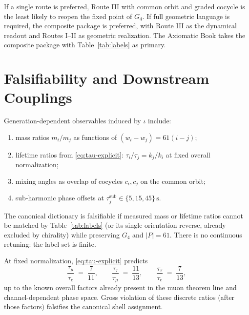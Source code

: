 \begin{lemma}
\label{lem:selection}
If a single route is preferred, Route III with common orbit and graded cocycle
is the least likely to reopen the fixed point of \(G_4\). If full geometric
language is required, the composite package is preferred, with Route III as the
dynamical readout and Routes I--II as geometric realization. The Axiomatic Book
takes the composite package with Table~\ref{tab:labels} as primary.
\end{lemma}

\section{Falsifiability and Downstream Couplings}
\label{sec:falsify}

\begin{definition}
Generation-dependent observables induced by \(\iota\) include:
\begin{enumerate}[label=(\roman*)]
  \item mass ratios \(m_i/m_j\) as functions of \((w_i-w_j)=61(i-j)\);
  \item lifetime ratios from \eqref{eq:tau-explicit}:
        \(\tau_i/\tau_j = k_j/k_i\) at fixed overall normalization;
  \item mixing angles as overlap of cocycles \(c_i,c_j\) on the common orbit;
  \item sub-harmonic phase offsets at \(\tau_j^{\mathrm{sub}}\in\{5,15,45\}\,\mathrm{s}\).
\end{enumerate}
\end{definition}

\begin{lemma}[Falsifiability]
\label{lem:falsify}
The canonical dictionary is falsifiable if measured mass or lifetime ratios
cannot be matched by Table~\ref{tab:labels} (or its single orientation reverse,
already excluded by chirality) while preserving \(G_4\) and \(|P|=61\). There is
no continuous retuning: the label set is finite.
\end{lemma}

\begin{corollary}
At fixed normalization, \eqref{eq:tau-explicit} predicts
\[
\frac{\tau_\mu}{\tau_e} \;=\; \frac{7}{11},\qquad
\frac{\tau_\tau}{\tau_\mu} \;=\; \frac{11}{13},\qquad
\frac{\tau_\tau}{\tau_e} \;=\; \frac{7}{13},
\]
up to the known overall factors already present in the muon theorem line and
channel-dependent phase space. Gross violation of these discrete ratios (after
those factors) falsifies the canonical shell assignment.
\end{corollary}

